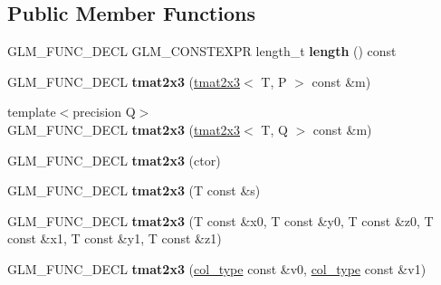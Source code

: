 \subsection*{Public Member Functions}
\begin{DoxyCompactItemize}
\item 
G\+L\+M\+\_\+\+F\+U\+N\+C\+\_\+\+D\+E\+CL G\+L\+M\+\_\+\+C\+O\+N\+S\+T\+E\+X\+PR length\+\_\+t {\bfseries length} () const \hypertarget{structglm_1_1detail_1_1tmat2x3_a50b132435afbe28b35006f885138392c}{}\label{structglm_1_1detail_1_1tmat2x3_a50b132435afbe28b35006f885138392c}

\item 
G\+L\+M\+\_\+\+F\+U\+N\+C\+\_\+\+D\+E\+CL {\bfseries tmat2x3} (\hyperlink{structglm_1_1detail_1_1tmat2x3}{tmat2x3}$<$ T, P $>$ const \&m)\hypertarget{structglm_1_1detail_1_1tmat2x3_a4d7107015eb343a44948415ecd5c8402}{}\label{structglm_1_1detail_1_1tmat2x3_a4d7107015eb343a44948415ecd5c8402}

\item 
{\footnotesize template$<$precision Q$>$ }\\G\+L\+M\+\_\+\+F\+U\+N\+C\+\_\+\+D\+E\+CL {\bfseries tmat2x3} (\hyperlink{structglm_1_1detail_1_1tmat2x3}{tmat2x3}$<$ T, Q $>$ const \&m)\hypertarget{structglm_1_1detail_1_1tmat2x3_a7fbd232bac090da9a982bd7071d0492b}{}\label{structglm_1_1detail_1_1tmat2x3_a7fbd232bac090da9a982bd7071d0492b}

\item 
G\+L\+M\+\_\+\+F\+U\+N\+C\+\_\+\+D\+E\+CL {\bfseries tmat2x3} (ctor)\hypertarget{structglm_1_1detail_1_1tmat2x3_ab7acd9cede9ab295cdd2ce31d19f7549}{}\label{structglm_1_1detail_1_1tmat2x3_ab7acd9cede9ab295cdd2ce31d19f7549}

\item 
G\+L\+M\+\_\+\+F\+U\+N\+C\+\_\+\+D\+E\+CL {\bfseries tmat2x3} (T const \&s)\hypertarget{structglm_1_1detail_1_1tmat2x3_aee77b4e0eece78d68bf0ae3a95c520a3}{}\label{structglm_1_1detail_1_1tmat2x3_aee77b4e0eece78d68bf0ae3a95c520a3}

\item 
G\+L\+M\+\_\+\+F\+U\+N\+C\+\_\+\+D\+E\+CL {\bfseries tmat2x3} (T const \&x0, T const \&y0, T const \&z0, T const \&x1, T const \&y1, T const \&z1)\hypertarget{structglm_1_1detail_1_1tmat2x3_a6e7924d5ec396e17f9029f69597a7815}{}\label{structglm_1_1detail_1_1tmat2x3_a6e7924d5ec396e17f9029f69597a7815}

\item 
G\+L\+M\+\_\+\+F\+U\+N\+C\+\_\+\+D\+E\+CL {\bfseries tmat2x3} (\hyperlink{structglm_1_1detail_1_1tvec3}{col\+\_\+type} const \&v0, \hyperlink{structglm_1_1detail_1_1tvec3}{col\+\_\+type} const \&v1)\hypertarget{structglm_1_1detail_1_1tmat2x3_ad26d0797d1a4ef0117dfd412dde991ea}{}\label{structglm_1_1detail_1_1tmat2x3_ad26d0797d1a4ef0117dfd412dde991ea}


\end{DoxyCompactItemize}

